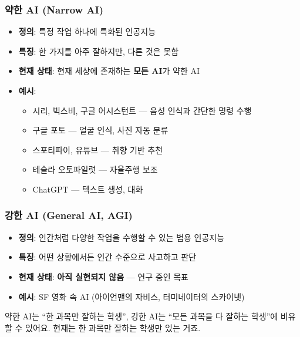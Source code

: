 \documentclass[11pt,a4paper]{article}
\begin{document}
\subsubsection{ 약한 AI (Narrow AI)}

\begin{itemize}[leftmargin=2em]
\item \textbf{정의}: 특정 작업 하나에 특화된 인공지능
\item \textbf{특징}: 한 가지를 아주 잘하지만, 다른 것은 못함
\item \textbf{현재 상태}: 현재 세상에 존재하는 \textbf{모든 AI}가 약한 AI
\item \textbf{예시}:
  \begin{itemize}
  \item {} 시리, 빅스비, 구글 어시스턴트 — 음성 인식과 간단한 명령 수행
  \item {} 구글 포토 — 얼굴 인식, 사진 자동 분류
  \item {} 스포티파이, 유튜브 — 취향 기반 추천
  \item {} 테슬라 오토파일럿 — 자율주행 보조
  \item {} ChatGPT — 텍스트 생성, 대화
  \end{itemize}
\end{itemize}

\subsubsection{ 강한 AI (General AI, AGI)}

\begin{itemize}[leftmargin=2em]
\item \textbf{정의}: 인간처럼 다양한 작업을 수행할 수 있는 범용 인공지능
\item \textbf{특징}: 어떤 상황에서든 인간 수준으로 사고하고 판단
\item \textbf{현재 상태}: \textbf{아직 실현되지 않음} — 연구 중인 목표
\item \textbf{예시}: SF 영화 속 AI (아이언맨의 자비스, 터미네이터의 스카이넷)
\end{itemize}

\begin{tipbox}
약한 AI는 ``한 과목만 잘하는 학생'', 강한 AI는 ``모든 과목을 다 잘하는 학생''에 비유할 수 있어요. 현재는 한 과목만 잘하는 학생만 있는 거죠.
\end{tipbox}
\end{document}
